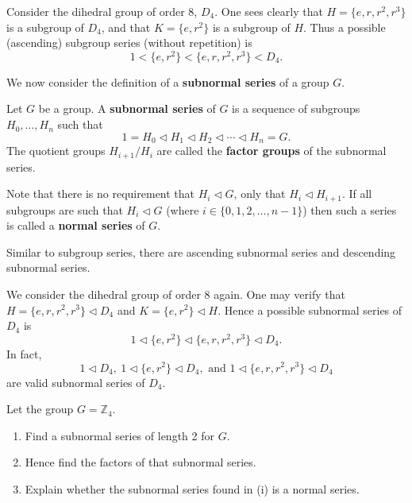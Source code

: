 \begin{example}
    Consider the dihedral group of order 8, $D_4$. One sees clearly that $H = \{e, r, r^2, r^3\}$ is a subgroup of $D_4$, and that $K = \{e, r^2\}$ is a subgroup of $H$. Thus a possible (ascending) subgroup series (without repetition) is
    \[
        1 < \{e, r^2\} < \{e, r, r^2, r^3\} < D_4.
    \]
\end{example}

We now consider the definition of a \textbf{subnormal series} of a group $G$.
\begin{definition}
    Let $G$ be a group. A \textbf{subnormal series} of $G$ is a sequence of subgroups $H_0, \dots, H_n$ such that
    \[
        1 = H_0 \lhd H_1 \lhd H_2 \lhd \cdots \lhd H_n = G.    
    \]
    The quotient groups $H_{i+1}/H_i$ are called the \textbf{factor groups} of the subnormal series.
\end{definition}
\begin{remark}
    Note that there is no requirement that $H_i \lhd G$, only that $H_i \lhd H_{i+1}$. If all subgroups are such that $H_i \lhd G$ (where $i \in \{0, 1, 2, \dots, n-1\}$) then such a series is called a \textbf{normal series} of $G$.
\end{remark}
\begin{remark}
    Similar to subgroup series, there are ascending subnormal series and descending subnormal series.
\end{remark}

\begin{example}
    We consider the dihedral group of order 8 again. One may verify that $H = \{e, r, r^2, r^3\} \lhd D_4$ and $K = \{e, r^2\} \lhd H$. Hence a possible subnormal series of $D_4$ is
    \[
        1 \lhd \{e, r^2\} \lhd \{e, r, r^2, r^3\} \lhd D_4.
    \]
    In fact,
    \[
        1 \lhd D_4, \ 1 \lhd \{e, r^2\} \lhd D_4, \text{ and } 1 \lhd \{e, r, r^2, r^3\} \lhd D_4
    \]
    are valid subnormal series of $D_4$.
\end{example}

\begin{exercise}
    Let the group $G = \mathbb{Z}_4$.
    \begin{enumerate}[label=(\roman*)]
        \item Find a subnormal series of length 2 for $G$.
        \item Hence find the factors of that subnormal series.
        \item Explain whether the subnormal series found in (i) is a normal series.
    \end{enumerate}
\end{exercise}

